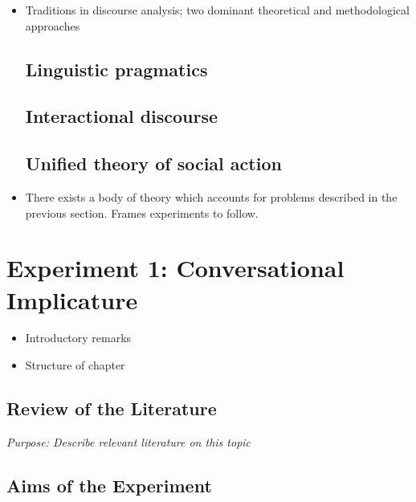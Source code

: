 \begin{itemize}
\item Traditions in discourse analysis; two dominant theoretical and methodological approaches

\subsection{Linguistic pragmatics}
\label{linguisticpragmatics}

\subsection{Interactional discourse}
\label{interactionaldiscourse}

\subsection{Unified theory of social action}
\label{unifiedtheoryofsocialaction}

\item There exists a body of theory which accounts for problems described in the previous section. Frames experiments to follow.

\end{itemize}

\section{Experiment 1: Conversational Implicature}
\label{experiment1:conversationalimplicature}

\begin{itemize}
\item Introductory remarks

\item Structure of chapter

\end{itemize}

\subsection{Review of the Literature}
\label{reviewoftheliterature}

\emph{Purpose: Describe relevant literature on this topic}

\subsection{Aims of the Experiment}
\label{aimsoftheexperiment}

